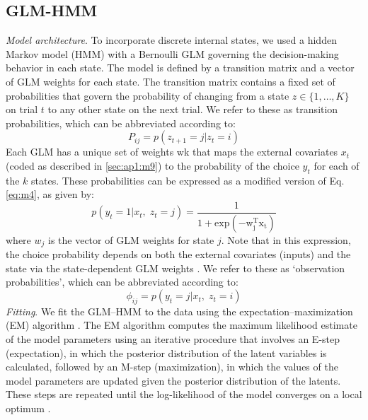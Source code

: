 \subsection{GLM-HMM}
\label{sec:ap1:m10}
\textit{Model architecture}. To incorporate discrete internal states, we used a hidden Markov model (HMM) with a Bernoulli GLM governing the decision-making behavior in each state. The model is defined by a transition matrix and a vector of GLM weights for each state. The transition matrix contains a fixed set of probabilities that govern the probability of changing from a state $z \in \{ 1, \ldots ,K\}$ on trial $t$ to any other state on the next trial. We refer to these as transition probabilities, which can be abbreviated according to: 
\begin{equation}
\label{eq:m6}
    P_{ij} = p\left( {z_{t + 1} = j|z_t = i} \right)
\end{equation}
Each GLM has a unique set of weights wk that maps the external covariates $x_t$ (coded as described in \ref{sec:ap1:m9}) to the probability of the choice $y_t$ for each of the $k$ states. These probabilities can be expressed as a modified version of Eq. \ref{eq:m4}, as given by:
\begin{equation}
\label{eq:m7}
    p\left( {y_t = 1|x_t,\;z_t = j} \right) = \frac{1}{{1 + {{{\mathrm{exp}}}}\left( { - {{{\mathrm{w}}}}_{{{\mathrm{j}}}}^{{{\mathrm{T}}}}{{{\mathrm{x}}}}_{{{\mathrm{t}}}}} \right)}}
\end{equation}
where $w_j$ is the vector of GLM weights for state $j$. Note that in this expression, the choice probability depends on both the external covariates (inputs) and the state via the state-dependent GLM weights \cite{bengio_input_1994,escola_hidden_2011,calhoun_unsupervised_2019}. We refer to these as ‘observation probabilities’, which can be abbreviated according to: 
\begin{equation}
\label{eq:m8}
    \phi _{ij} = p\left( {y_t = j|x_t,\;z_t = i} \right)
\end{equation}
\textit{Fitting}. We fit the GLM–HMM to the data using the expectation–maximization (EM) algorithm \cite{escola_hidden_2011}. The EM algorithm computes the maximum likelihood estimate of the model parameters using an iterative procedure that involves an E-step (expectation), in which the posterior distribution of the latent variables is calculated, followed by an M-step (maximization), in which the values of the model parameters are updated given the posterior distribution of the latents. These steps are repeated until the log-likelihood of the model converges on a local optimum \cite{bishop_pattern_2006}. \\
